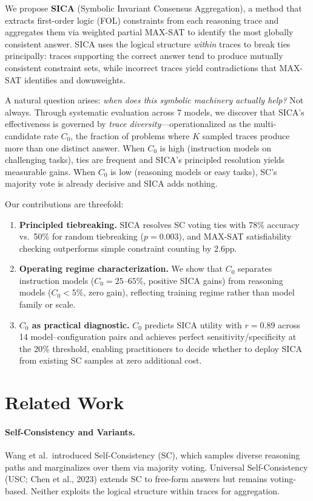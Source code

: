 \documentclass[11pt,a4paper]{article}
\begin{document}
We propose \textbf{SICA} (Symbolic Invariant Consensus Aggregation), a method that extracts first-order logic (FOL) constraints from each reasoning trace and aggregates them via weighted partial MAX-SAT to identify the most globally consistent answer. SICA uses the logical structure \emph{within} traces to break ties principally: traces supporting the correct answer tend to produce mutually consistent constraint sets, while incorrect traces yield contradictions that MAX-SAT identifies and downweights.

A natural question arises: \emph{when does this symbolic machinery actually help?} Not always. Through systematic evaluation across 7 models, we discover that SICA's effectiveness is governed by \emph{trace diversity}---operationalized as the multi-candidate rate $C_0$, the fraction of problems where $K$ sampled traces produce more than one distinct answer. When $C_0$ is high (instruction models on challenging tasks), ties are frequent and SICA's principled resolution yields measurable gains. When $C_0$ is low (reasoning models or easy tasks), SC's majority vote is already decisive and SICA adds nothing.

Our contributions are threefold:
\begin{enumerate}
\item \textbf{Principled tiebreaking.} SICA resolves SC voting ties with 78\% accuracy vs.\ 50\% for random tiebreaking ($p=0.003$), and MAX-SAT satisfiability checking outperforms simple constraint counting by 2.6pp.
\item \textbf{Operating regime characterization.} We show that $C_0$ separates instruction models ($C_0=25$--$65\%$, positive SICA gains) from reasoning models ($C_0<5\%$, zero gain), reflecting training regime rather than model family or scale.
\item \textbf{$C_0$ as practical diagnostic.} $C_0$ predicts SICA utility with $r=0.89$ across 14 model--configuration pairs and achieves perfect sensitivity/specificity at the 20\% threshold, enabling practitioners to decide whether to deploy SICA from existing SC samples at zero additional cost.
\end{enumerate}

\section{Related Work}
\label{sec:related}

\paragraph{Self-Consistency and Variants.}
Wang et al.\ introduced Self-Consistency (SC), which samples diverse reasoning paths and marginalizes over them via majority voting. Universal Self-Consistency (USC; Chen et al., 2023) extends SC to free-form answers but remains voting-based. Neither exploits the logical structure within traces for aggregation.
\end{document}
